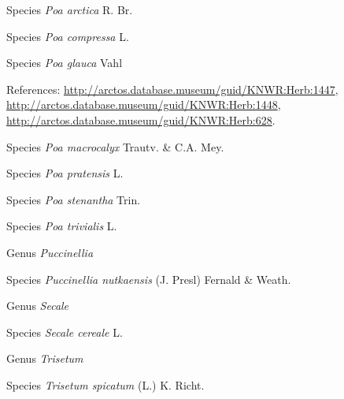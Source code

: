 \documentclass[9pt, article]{memoir}
\begin{document}
\begin{multicols}{2}
\vspace{6pt}\noindent\hspace{36pt}Species \textit{Poa arctica} R. Br.


\vspace{6pt}\noindent\hspace{36pt}Species \textit{Poa compressa} L.


\vspace{6pt}\noindent\hspace{36pt}Species \textit{Poa glauca} Vahl


\vspace{6pt}References: 
\url{http://arctos.database.museum/guid/KNWR:Herb:1447}, 
\url{http://arctos.database.museum/guid/KNWR:Herb:1448}, 
\url{http://arctos.database.museum/guid/KNWR:Herb:628}.

\vspace{6pt}\noindent\hspace{36pt}Species \textit{Poa macrocalyx} Trautv. \& C.A. Mey.


\vspace{6pt}\noindent\hspace{36pt}Species \textit{Poa pratensis} L.


\vspace{6pt}\noindent\hspace{36pt}Species \textit{Poa stenantha} Trin.


\vspace{6pt}\noindent\hspace{36pt}Species \textit{Poa trivialis} L.


\vspace{6pt}\noindent\hspace{30pt}Genus \textit{Puccinellia}


\vspace{6pt}\noindent\hspace{36pt}Species \textit{Puccinellia nutkaensis} (J. Presl) Fernald \& Weath.


\vspace{6pt}\noindent\hspace{30pt}Genus \textit{Secale}


\vspace{6pt}\noindent\hspace{36pt}Species \textit{Secale cereale} L.


\vspace{6pt}\noindent\hspace{30pt}Genus \textit{Trisetum}


\vspace{6pt}\noindent\hspace{36pt}Species \textit{Trisetum spicatum} (L.) K. Richt.



\end{multicols}
\end{document}
